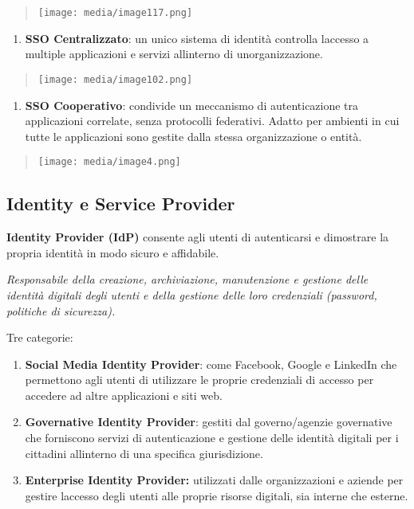 \begin{quote}
\texttt{[image: media/image117.png]}
\end{quote}

\begin{enumerate}
\def\labelenumi{\arabic{enumi}.}
\setcounter{enumi}{1}
\item
  \textbf{SSO Centralizzato}: un unico sistema di identità controlla
  l\textquotesingle accesso a multiple applicazioni e servizi
  all\textquotesingle interno di un\textquotesingle organizzazione.
\end{enumerate}

\begin{quote}
\texttt{[image: media/image102.png]}
\end{quote}

\begin{enumerate}
\def\labelenumi{\arabic{enumi}.}
\setcounter{enumi}{2}
\item
  \textbf{SSO Cooperativo}: condivide un meccanismo di autenticazione
  tra applicazioni correlate, senza protocolli federativi. Adatto per
  ambienti in cui tutte le applicazioni sono gestite dalla stessa
  organizzazione o entità.
\end{enumerate}

\begin{quote}
\texttt{[image: media/image4.png]}
\end{quote}

\subsection{Identity e Service
Provider}\label{identity-e-service-provider}

\textbf{Identity Provider (IdP)} consente agli utenti di autenticarsi e
dimostrare la propria identità in modo sicuro e affidabile.

\emph{Responsabile della creazione, archiviazione, manutenzione e
gestione delle identità digitali degli utenti e della gestione delle
loro credenziali (password, politiche di sicurezza).}

Tre categorie:

\begin{enumerate}
\def\labelenumi{\arabic{enumi}.}
\item
  \textbf{Social Media Identity Provider}: come Facebook, Google e
  LinkedIn che permettono agli utenti di utilizzare le proprie
  credenziali di accesso per accedere ad altre applicazioni e siti web.
\item
  \textbf{Governative Identity Provider}: gestiti dal governo/agenzie
  governative che forniscono servizi di autenticazione e gestione delle
  identità digitali per i cittadini all\textquotesingle interno di una
  specifica giurisdizione.
\item
  \textbf{Enterprise Identity Provider:} utilizzati dalle organizzazioni
  e aziende per gestire l\textquotesingle accesso degli utenti alle
  proprie risorse digitali, sia interne che esterne.
\end{enumerate}

